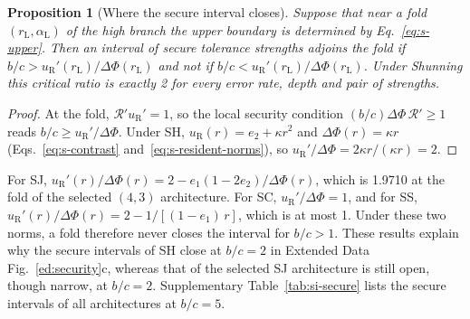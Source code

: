 \documentclass[10pt]{wlscirep}
\newcommand{\Rmap}{\mathscr{R}}            %
\theoremstyle{plain}
\newtheorem{proposition}[lemma]{Proposition}
\theoremstyle{remark}
\begin{document}
\begin{proposition}[Where the secure interval closes]\label{prop:closing}
Suppose that near a fold $(r_{\mathrm L},\alpha_{\mathrm L})$ of the high branch the upper boundary is determined by Eq.~\eqref{eq:s-upper}. Then an interval of secure tolerance strengths adjoins the fold if $b/c>u_{\mathrm R}'(r_{\mathrm L})/\Delta\Phi(r_{\mathrm L})$ and not if $b/c<u_{\mathrm R}'(r_{\mathrm L})/\Delta\Phi(r_{\mathrm L})$. Under Shunning this critical ratio is exactly 2 for every error rate, depth and pair of strengths.
\end{proposition}
\begin{proof}
At the fold, $\Rmap'u_{\mathrm R}'=1$, so the local security condition $(b/c)\Delta\Phi\,\Rmap'\geq1$ reads $b/c\geq u_{\mathrm R}'/\Delta\Phi$. Under SH, $u_{\mathrm R}(r)=e_2+\kappa r^2$ and $\Delta\Phi(r)=\kappa r$ (Eqs.~\eqref{eq:s-contrast} and~\eqref{eq:s-resident-norms}), so $u_{\mathrm R}'/\Delta\Phi=2\kappa r/(\kappa r)=2$.
\end{proof}

For SJ, $u_{\mathrm R}'(r)/\Delta\Phi(r)=2-e_1(1-2e_2)/\Delta\Phi(r)$, which is 1.9710 at the fold of the selected $(4,3)$ architecture. For SC, $u_{\mathrm R}'/\Delta\Phi=1$, and for SS, $u_{\mathrm R}'(r)/\Delta\Phi(r)=2-1/[(1-e_1)\,r]$, which is at most 1. Under these two norms, a fold therefore never closes the interval for $b/c>1$. These results explain why the secure intervals of SH close at $b/c=2$ in Extended Data Fig.~\ref{ed:security}c, whereas that of the selected SJ architecture is still open, though narrow, at $b/c=2$. Supplementary Table~\ref{tab:si-secure} lists the secure intervals of all architectures at $b/c=5$.
\end{document}
